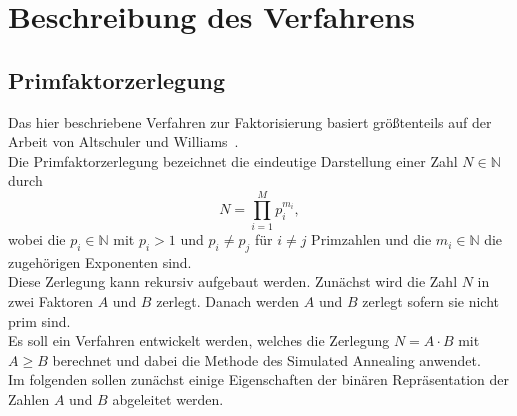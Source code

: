 \chapter{Beschreibung des Verfahrens}\label{ch:algorithm}

\section{Primfaktorzerlegung}
Das hier beschriebene Verfahren zur Faktorisierung basiert größtenteils auf der Arbeit von Altschuler und Williams~\parencite{altschuler}. \\
Die Primfaktorzerlegung bezeichnet die eindeutige Darstellung einer Zahl $N\in\mathbb{N}$ durch
\begin{equation*}
  N=\prod\limits_{i=1}^M p_i^{m_i},
\end{equation*}
wobei die $p_i\in\mathbb{N}$ mit $p_i>1$ und $p_i\neq p_j$ für $i\neq j$ Primzahlen und die $m_i\in\mathbb{N}$ die zugehörigen Exponenten sind.\\
Diese Zerlegung kann rekursiv aufgebaut werden. Zunächst wird die Zahl $N$ in zwei Faktoren $A$ und $B$ zerlegt. Danach werden $A$ und $B$ zerlegt sofern sie nicht prim sind.\\
Es soll ein Verfahren entwickelt werden, welches die Zerlegung $N=A\cdot B$ mit $A\geq B$ berechnet und dabei die Methode des Simulated Annealing anwendet.\\
Im folgenden sollen zunächst einige Eigenschaften der binären Repräsentation der Zahlen $A$ und $B$ abgeleitet werden.

